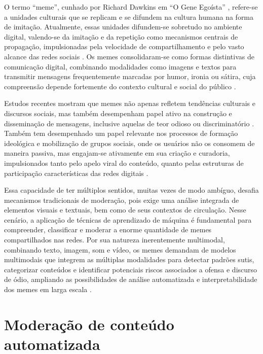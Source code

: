 O termo “meme”, cunhado por Richard Dawkins em ``O Gene Egoísta'' \cite{Dawkins1976}, refere-se a unidades culturais que se replicam e se difundem na cultura humana na forma de imitação. Atualmente, essas unidades difundem-se sobretudo no ambiente digital, valendo-se da imitação e da repetição como mecanismos centrais de propagação, impulsionadas pela velocidade de compartilhamento e pelo vasto alcance das redes sociais \cite{shifman2013memes}. Os memes consolidaram-se como formas distintivas de comunicação digital, combinando modalidades como imagens e textos para transmitir mensagens frequentemente marcadas por humor, ironia ou sátira, cuja compreensão depende fortemente do contexto cultural e social do público \cite{horta2015meme}.

Estudos recentes mostram que memes não apenas refletem tendências culturais e discursos sociais, mas também desempenham papel ativo na construção e disseminação de mensagens, inclusive aquelas de teor odioso ou discriminatório \cite{peixoto2020}. Também tem desempenhado um papel relevante nos processos de formação ideológica e mobilização de grupos sociais, onde os usuários não os consomem de maneira passiva, mas engajam-se ativamente em sua criação e curadoria, impulsionados tanto pelo apelo viral do conteúdo, quanto pelas estruturas de participação características das redes digitais \cite{wiggins2019}.

Essa capacidade de ter múltiplos sentidos, muitas vezes de modo ambíguo, desafia mecanismos tradicionais de moderação, pois exige uma análise integrada de elementos visuais e textuais, bem como de seus contextos de circulação. Nesse cenário, a aplicação de técnicas de aprendizado de máquina é fundamental para compreender, classificar e moderar a enorme quantidade de memes compartilhados nas redes. Por sua natureza inerentemente multimodal, combinando texto, imagem, som e vídeo, os memes demandam de modelos multimodais que integrem as múltiplas modalidades para detectar padrões sutis, categorizar conteúdos e identificar potenciais riscos associados a ofensa e discurso de ódio, ampliando as possibilidades de análise automatizada e interpretabilidade dos memes em larga escala \cite{ArticleHatefulMemesChallenge2020}.

\section{Moderação de conteúdo automatizada}

